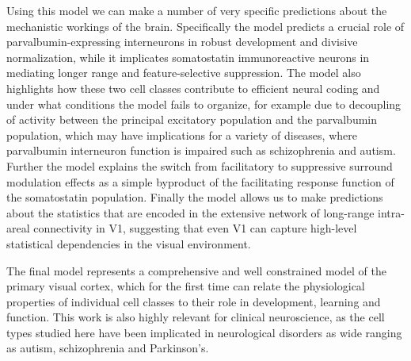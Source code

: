 Using this model we can make a number of very specific predictions
about the mechanistic workings of the brain. Specifically the model
predicts a crucial role of parvalbumin-expressing interneurons in
robust development and divisive normalization, while it implicates
somatostatin immunoreactive neurons in mediating longer range and
feature-selective suppression. The model also highlights how these two
cell classes contribute to efficient neural coding and under what
conditions the model fails to organize, for example due to decoupling
of activity between the principal excitatory population and the
parvalbumin population, which may have implications for a variety of
diseases, where parvalbumin interneuron function is impaired such as
schizophrenia and autism. Further the model explains the switch from
facilitatory to suppressive surround modulation effects as a simple
byproduct of the facilitating response function of the somatostatin
population. Finally the model allows us to make predictions about the
statistics that are encoded in the extensive network of long-range
intra-areal connectivity in V1, suggesting that even V1 can capture
high-level statistical dependencies in the visual environment.

The final model represents a comprehensive and well constrained model
of the primary visual cortex, which for the first time can relate the
physiological properties of individual cell classes to their role in
development, learning and function. This work is also highly relevant
for clinical neuroscience, as the cell types studied here have been
implicated in neurological disorders as wide ranging as autism,
schizophrenia and Parkinson's.
\endgroup
